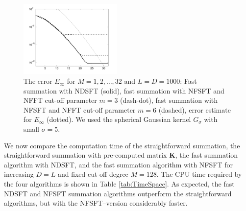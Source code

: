 \documentclass[11pt,a4paper,twoside,bibtotoc]{scrartcl}
\theoremstyle{plain}
\theoremstyle{definition}
\theoremstyle{remark}
\numberwithin{equation}{section}
\numberwithin{table}{section}
\numberwithin{figure}{section}
\begin{document}
\begin{figure}[tb]
  \centering
  \includegraphics[width=0.45\textwidth]{images/gaussian_test2}
  \caption{The error $E_{\infty}$ for $M = 1,2,\ldots,32$ and $L = D = 1000$: 
  Fast summation with NDSFT (solid), fast summation with NFSFT and 
  NFFT cut-off parameter $m = 3$ (dash-dot), fast summation with NFSFT and NFFT cut-off 
  parameter $m = 6$ (dashed), error estimate for $E_{\infty}$ (dotted). We used the
  spherical Gaussian kernel $G_{\sigma}$ with small $\sigma=5$.}
  \label{fig:gtest2}
\end{figure}

We now compare the computation time of the straightforward summation, the
straightforward summation with pre-computed matrix $\mathbf{K}$, the fast summation
algorithm with NDSFT, and the fast summation algorithm with NFSFT for
increasing $D=L$ and fixed cut-off degree $M=128$. 
The CPU time required by the four algorithms is shown in Table
\ref{tab:TimeSpace}. 
As expected, the fast NDSFT and NFSFT summation algorithms outperform the 
straightforward algorithms, but with the NFSFT--version considerably faster.
\end{document}
